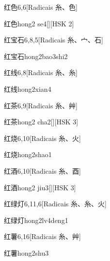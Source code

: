 \begin{entry}{红色}{6,6}[Radicais ⽷、⾊]
  \begin{phonetics}{红色}{hong2 se4}[][HSK 2]
  \end{phonetics}
\end{entry}

\begin{entry}{红宝石}{6,8,5}[Radicais ⽷、⼧、⽯]
  \begin{phonetics}{红宝石}{hong2bao3shi2}
  \end{phonetics}
\end{entry}

\begin{entry}{红线}{6,8}[Radicais ⽷、⽷]
  \begin{phonetics}{红线}{hong2xian4}
  \end{phonetics}
\end{entry}

\begin{entry}{红茶}{6,9}[Radicais ⽷、⾋]
  \begin{phonetics}{红茶}{hong2 cha2}[][HSK 3]
  \end{phonetics}
\end{entry}

\begin{entry}{红烧}{6,10}[Radicais ⽷、⽕]
  \begin{phonetics}{红烧}{hong2shao1}
  \end{phonetics}
\end{entry}

\begin{entry}{红酒}{6,10}[Radicais ⽷、⾣]
  \begin{phonetics}{红酒}{hong2 jiu3}[][HSK 3]
  \end{phonetics}
\end{entry}

\begin{entry}{红绿灯}{6,11,6}[Radicais ⽷、⽷、⽕]
  \begin{phonetics}{红绿灯}{hong2lv4deng1}
  \end{phonetics}
\end{entry}

\begin{entry}{红薯}{6,16}[Radicais ⽷、⾋]
  \begin{phonetics}{红薯}{hong2shu3}
  \end{phonetics}
\end{entry}

